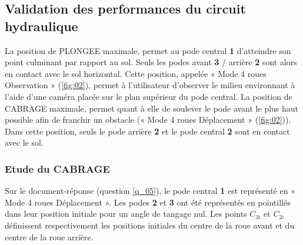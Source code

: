 \ifprof
\begin{corrige}
\end{corrige}
\else
\fi



\subsection{Validation des performances du circuit hydraulique}

La position de PLONGEE maximale, permet au pode central \textbf{1} d’atteindre son point culminant par rapport au sol. Seuls les podes avant \textbf{3} / arrière \textbf{2} sont alors en contact avec le sol horizontal. Cette position, appelée « Mode 4 roues Observation » (\autoref{fig:02}), permet à l’utilisateur d’observer le milieu environnant à l’aide d’une caméra placée sur le plan supérieur du pode central. La position de CABRAGE maximale, permet quant à elle de soulever le pode avant le plus haut possible afin de franchir un obstacle (« Mode 4 roues Déplacement » (\autoref{fig:02})). Dans cette position, seuls le pode arrière \textbf{2} et le pode central \textbf{2} sont en contact avec le sol.

\subsubsection{Etude du CABRAGE}

Sur le document-réponse (question \ref{q_05}), le pode central \textbf{1} est représenté en « Mode 4 roues Déplacement ». Les podes \textbf{2} et \textbf{3} ont été représentés en pointillés dans leur position initiale pour un angle de tangage nul. Les points $C_{3i}$ et $C_{2i}$ définissent respectivement les positions initiales du centre de la roue avant et du centre de la roue arrière.

\ifprof
\begin{corrige}
\end{corrige}
\else
\fi


